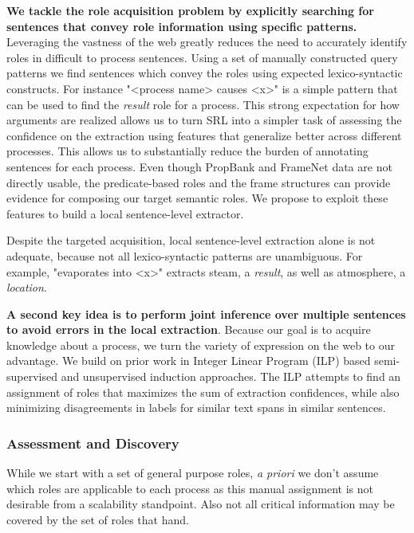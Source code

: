 {\bf We tackle the role acquisition problem by explicitly searching for sentences that convey role information using specific patterns.}
Leveraging the vastness of the web greatly reduces the need to accurately identify roles in difficult to process sentences.
Using a set of manually constructed query patterns we find sentences which convey the roles using expected lexico-syntactic constructs. 
For instance "<process name> causes <x>" is a simple pattern that can be used to find the {\em result} role for a process. 
This strong expectation for how arguments are realized allows us to turn SRL into a simpler task of assessing the confidence on the extraction using features that generalize better across different processes.  
This allows us to substantially reduce the burden of annotating sentences for each process.
Even though PropBank and FrameNet data are not directly usable, the predicate-based roles and the frame structures can provide evidence for composing our target semantic roles. 
We propose to exploit these features to build a local sentence-level extractor.


Despite the targeted acquisition, local sentence-level extraction alone is not adequate, because not all lexico-syntactic patterns are unambiguous. 
For example, "evaporates into <x>" extracts steam, a {\em result}, as well as atmosphere, a {\em location}. 

{\bf A second key idea is to perform joint inference over multiple sentences to avoid errors in the local extraction}.
Because our goal is to acquire knowledge about a process, we turn the variety of expression on the web to our advantage. 
We build on prior work in Integer Linear Program (ILP) based semi-supervised and unsupervised induction approaches. 
The ILP attempts to find an assignment of roles that maximizes the sum of extraction confidences, 
while also minimizing disagreements in labels for similar text spans in similar sentences.

\subsubsection*{Assessment and Discovery}
While we start with a set of general purpose roles, {\em a priori} we don't assume which roles are applicable to each process as this manual assignment is not desirable from a scalability standpoint.
Also not all critical information may be covered by the set of roles that hand.

